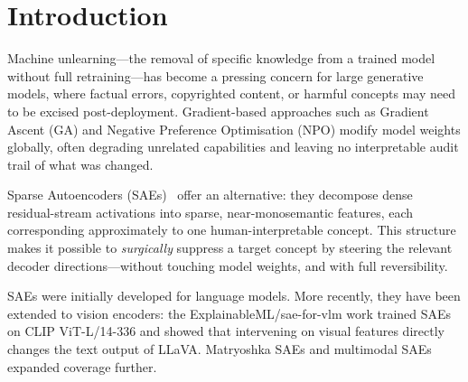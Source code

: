 \documentclass{article}
\begin{document}
\section{Introduction}
\label{sec:intro}

Machine unlearning—the removal of specific knowledge from a trained
model without full retraining—has become a pressing concern for large
generative models, where factual errors, copyrighted content, or harmful
concepts may need to be excised post-deployment. Gradient-based
approaches such as Gradient Ascent (GA) and Negative Preference
Optimisation (NPO) modify model weights globally, often degrading
unrelated capabilities and leaving no interpretable audit trail of what
was changed.

Sparse Autoencoders (SAEs)~\citep{elhage2022superposition,
anthropic2023monosemanticity} offer an alternative: they decompose dense
residual-stream activations into sparse, near-monosemantic features, each
corresponding approximately to one human-interpretable concept. This
structure makes it possible to \emph{surgically} suppress a target concept
by steering the relevant decoder directions---without touching model
weights, and with full reversibility.

SAEs were initially developed for language models. More recently, they
have been extended to vision encoders: the ExplainableML/sae-for-vlm
work \citep{pach2025saevlm} trained SAEs on CLIP ViT-L/14-336 and
showed that intervening on visual features directly changes the text
output of LLaVA. Matryoshka SAEs \citep{wolodja2025msae} and multimodal
SAEs \citep{evolvingLMMs2025} expanded coverage further.
\end{document}
